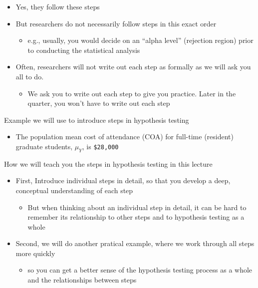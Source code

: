 \documentclass[
  letterpaper,
  DIV=11,
  numbers=noendperiod]{scrartcl}
\providecommand{\tightlist}{%
  \setlength{\itemsep}{0pt}\setlength{\parskip}{0pt}}\usepackage{longtable,booktabs,array}
\begin{document}
\begin{itemize}
\tightlist
\item
  Yes, they follow these steps
\item
  But researchers do not necessarily follow steps in this exact order

  \begin{itemize}
  \tightlist
  \item
    e.g., usually, you would decide on an ``alpha level'' (rejection
    region) prior to conducting the statistical analysis
  \end{itemize}
\item
  Often, researchers will not write out each step as formally as we will
  ask you all to do.

  \begin{itemize}
  \tightlist
  \item
    We ask you to write out each step to give you practice. Later in the
    quarter, you won't have to write out each step
  \end{itemize}
\end{itemize}

Example we will use to introduce steps in hypothesis testing

\begin{itemize}
\tightlist
\item
  The population mean cost of attendance (COA) for full-time (resident)
  graduate students, \(\mu_Y\), is \texttt{\$28,000}
\end{itemize}

How we will teach you the steps in hypothesis testing in this lecture

\begin{itemize}
\tightlist
\item
  First, Introduce individual steps in detail, so that you develop a
  deep, conceptual understanding of each step

  \begin{itemize}
  \tightlist
  \item
    But when thinking about an individual step in detail, it can be hard
    to remember its relationship to other steps and to hypothesis
    testing as a whole
  \end{itemize}
\item
  Second, we will do another pratical example, where we work through all
  steps more quickly

  \begin{itemize}
  \tightlist
  \item
    so you can get a better sense of the hypothesis testing process as a
    whole and the relationships between steps
  \end{itemize}
\end{itemize}
\end{document}
